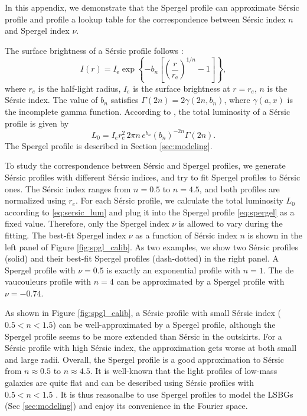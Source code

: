 \documentclass[twocolumn,astrosymb,twocolappendix]{aastex631}
\newcommand{\sersic}{S\'ersic}
\begin{document}
\begin{CJK*}{UTF8}{gbsn}
In this appendix, we demonstrate that the Spergel profile can approximate \sersic{} profile and profile a lookup table for the correspondence between \sersic{} index $n$ and Spergel index $\nu$.

The surface brightness of a \sersic{} profile follows \citep{Sersic1963,Graham2005}:
\begin{equation}\label{eq:sersic}
    I(r)=I_{\mathrm{e}} \exp \left\{-b_{n}\left[\left(\frac{r}{r_{\mathrm{e}}}\right)^{1 / n}-1\right]\right\},
\end{equation}
where $r_e$ is the half-light radius, $I_e$ is the surface brightness at $r=r_e$, $n$ is the \sersic{} index. The value of $b_n$ satisfies $\Gamma(2 n)=2 \gamma\left(2 n, b_{n}\right)$, where $\gamma(a, x)$ is the incomplete gamma function. According to \citet{Graham2005}, the total luminosity of a \sersic{} profile is given by 
\begin{equation}\label{eq:sersic_lum}
    L_0 = I_{e} r_{e}^{2}\, 2 \pi n\, e^{b_{n}} \left(b_{n}\right)^{-2 n} \Gamma(2 n).
\end{equation}
The Spergel profile is described in Section \ref{sec:modeling}. 

To study the correspondence between \sersic{} and Spergel profiles, we generate \sersic{} profiles with different \sersic{} indices, and try to fit Spergel profiles to \sersic{} ones. The \sersic{} index ranges from $n=0.5$ to $n=4.5$, and both profiles are normalized using $r_e$. For each \sersic{} profile, we calculate the total luminosity $L_0$ according to \eqref{eq:sersic_lum} and plug it into the Spergel profile \eqref{eq:spergel} as a fixed value. Therefore, only the Spergel index $\nu$ is allowed to vary during the fitting. The best-fit Spergel index $\nu$ as a function of \sersic{} index $n$ is shown in the left panel of Figure \ref{fig:spgl_calib}. As two examples, we show two \sersic{} profiles (solid) and their best-fit Spergel profiles (dash-dotted) in the right panel. A Spergel profile with $\nu=0.5$ is exactly an exponential profile with $n=1$. The de vaucouleurs profile \citep{deVaucouleurs1948} with $n=4$ can be approximated by a Spergel profile with $\nu=-0.74$. 

As shown in Figure \ref{fig:spgl_calib}, a \sersic{} profile with small \sersic{} index ($0.5 < n < 1.5$) can be well-approximated by a Spergel profile, although the Spergel profile seems to be more extended than \sersic{} in the outskirts. For a \sersic{} profile with high \sersic{} index, the approximation gets worse at both small and large radii. Overall, the Spergel profile is a good approximation to \sersic{} from $n\approx 0.5$ to $n\approx 4.5$. It is well-known that the light profiles of low-mass galaxies are quite flat and can be described using \sersic{} profiles with $0.5 < n < 1.5$ \citep[e.g.,][]{Lange2015,Greco2018,ELVES-I}. It is thus reasonalbe to use Spergel profiles to model the LSBGs (Sec \ref{sec:modeling}) and enjoy its convenience in the Fourier space. 


\end{CJK*}
\end{document}
